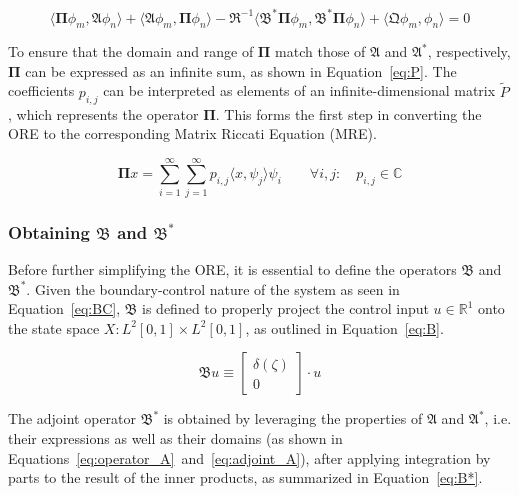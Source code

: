 \begin{equation} \label{eq:ORE_2}
    \langle \mathbf{\Pi} \phi_m, \mathfrak{A} \phi_n \rangle
    + \langle \mathfrak{A} \phi_m, \mathbf{\Pi} \phi_n \rangle
    - \mathfrak{R}^{-1} \langle \mathfrak{B}^* \mathbf{\Pi} \phi_m, \mathfrak{B}^* \mathbf{\Pi} \phi_n \rangle 
    + \langle \mathfrak{Q} \phi_m, \phi_n \rangle = 0
\end{equation}

To ensure that the domain and range of $\mathbf{\Pi}$ match those of $\mathfrak{A}$ and $\mathfrak{A}^*$, respectively, $\mathbf{\Pi}$ can be expressed as an infinite sum, as shown in Equation~\ref{eq:P}. The coefficients $p_{i,j}$ can be interpreted as elements of an infinite-dimensional matrix $\tilde{P}$, which represents the operator $\mathbf{\Pi}$. This forms the first step in converting the ORE to the corresponding Matrix Riccati Equation (MRE).

\begin{equation} \label{eq:P}
    \mathbf{\Pi} x = \sum_{i=1}^{\infty}\sum_{j=1}^{\infty} p_{i,j} \langle x, \psi_j \rangle \psi_i \qquad
    \forall {i,j}: \quad p_{i,j} \in \mathbb{C}
\end{equation}

\subsubsection{Obtaining $\mathfrak{B}$ and $\mathfrak{B}^*$}

Before further simplifying the ORE, it is essential to define the operators $\mathfrak{B}$ and $\mathfrak{B}^*$. Given the boundary-control nature of the system as seen in Equation~\ref{eq:BC}, $\mathfrak{B}$ is defined to properly project the control input $u \in \mathbb{R}^1$ onto the state space $X: L^2[0,1] \times L^2[0,1]$, as outlined in Equation~\ref{eq:B}.

\begin{equation} \label{eq:B}
    \mathfrak{B} u \equiv
    \begin{bmatrix}
        \delta(\zeta) \\ 0
    \end{bmatrix} \cdot u
\end{equation}

The adjoint operator $\mathfrak{B}^*$ is obtained by leveraging the properties of $\mathfrak{A}$ and $\mathfrak{A}^*$, i.e. their expressions as well as their domains (as shown in Equations~\ref{eq:operator_A}~and~\ref{eq:adjoint_A}), after applying integration by parts to the result of the inner products, as summarized in Equation~\ref{eq:B*}.

